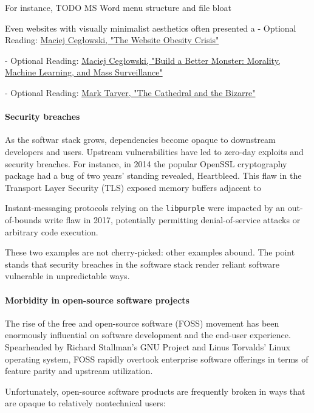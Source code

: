 For instance,
TODO MS Word menu structure and file bloat

Even websites with visually minimalist aesthetics often presented
\citeauthor{Ceglowski2015}
a
- Optional Reading: \href{https://idlewords.com/talks/website_obesity.htm}{Maciej Cegłowski, "The Website Obesity Crisis"}

- Optional Reading: \href{https://idlewords.com/talks/build_a_better_monster.htm}{Maciej Cegłowski, "Build a Better Monster: Morality, Machine Learning, and Mass Surveillance"}

- Optional Reading: \href{http://marktarver.com/thecathedralandthebizarre.html}{Mark Tarver, "The Cathedral and the Bizarre"}


\paragraph{Security breaches}

As the softwar stack grows, dependencies become opaque to downstream developers and users.  Upstream vulnerabilities have led to zero-day exploits and security breaches.  For instance, in 2014 the popular OpenSSL cryptography package had a bug of two years' standing revealed, Heartbleed.  This flaw in the Transport Layer Security (TLS) exposed memory buffers adjacent to

Instant-messaging protocols relying on the \texttt{libpurple} were impacted by an out-of-bounds write flaw in 2017, potentially permitting denial-of-service attacks or arbitrary code execution.

These two examples are not cherry-picked:  other examples abound.  The point stands that security breaches in the software stack render reliant software vulnerable in unpredictable ways.

\paragraph{Morbidity in open-source software projects}

The rise of the free and open-source software (FOSS) movement has been enormously influential on software development and the end-user experience.  Spearheaded by Richard Stallman's GNU Project and Linus Torvalds' Linux operating system, FOSS rapidly overtook enterprise software offerings in terms of feature parity and upstream utilization.

Unfortunately, open-source software products are frequently broken in ways that are opaque to relatively nontechnical users:

